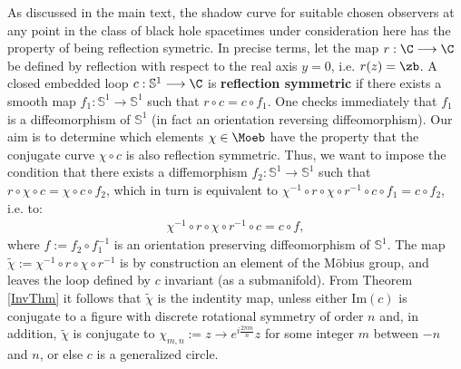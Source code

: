As discussed in the main text, the shadow curve for suitable chosen
observers at any point in the class of black hole spacetimes under
consideration here has the property of being reflection symetric.
In precise terms, let  the map $r: \C
\longrightarrow \C$ be defined by reflection 
with respect to the real axis  $y=0$, i.e. $r(z) = \zb$.
A closed embedded loop
$c : \mathbb{S}^1  \longrightarrow \C$
is {\bf reflection symmetric} if there exists
a smooth map $f_1 : \mathbb{S}^1 \longrightarrow \mathbb{S}^1$ such that
$r \circ c = c \circ f_1$. One checks immediately that $f_1$ is 
a diffeomorphism of $\mathbb{S}^1$ (in fact an orientation reversing
diffeomorphism).  
Our aim is to determine
which elements $\chi \in \Moeb$ have the property that
the conjugate curve $\chi \circ c$ is also 
reflection symmetric.  Thus, we want to impose the 
condition that there exists a diffemorphism $f_2 : \mathbb{S}^1
\longrightarrow \mathbb{S}^1$ such that
$r \circ \chi \circ c = \chi \circ c \circ f_2$, which in turn is equivalent to
$\chi^{-1} \circ r \circ \chi \circ r^{-1} \circ c \circ f_1 = c \circ f_2$,
i.e. to:
\begin{align*}
\chi^{-1} \circ r \circ \chi \circ r^{-1} \circ c  = c \circ f,
\end{align*}
where $f := f_2 \circ f_1^{-1}$ is an orientation preserving
diffeomorphism of $\mathbb{S}^1$.
The map 
$\widetilde{\chi}:=
\chi^{-1} \circ r \circ \chi \circ r^{-1} $ is by construction an element
of the M\"obius group, and leaves the loop defined by $c$ invariant (as 
a submanifold). From Theorem \ref{InvThm} it follows
that $\widetilde{\chi}$ is the indentity map, unless either 
$\mbox{Im}(c)$
is conjugate to a figure with discrete rotational symmetry of order $n$
and, in addition, $\widetilde{\chi}$ is conjugate
to $\chi_{m,n} := z \rightarrow e^{i \frac{2 \pi m}{n}} z$ for some integer $m$
between $-n$ and $n$,  or else  $c$ is a generalized circle.  

